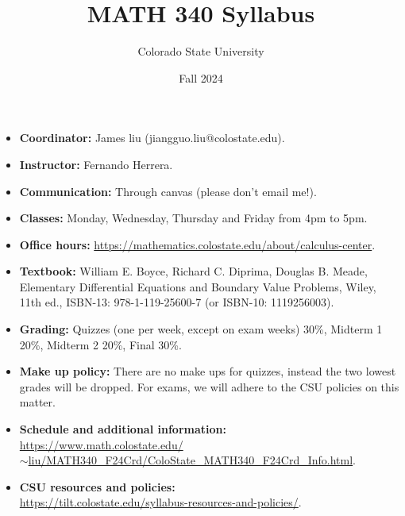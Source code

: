 \documentclass{article}
\begin{document}
\title{MATH 340 Syllabus}
\author{Colorado State University}
\date{Fall 2024}
\maketitle
\begin{itemize}
	\item \textbf{Coordinator:} James liu (jiangguo.liu@colostate.edu).
	\item \textbf{Instructor:} Fernando Herrera.
	\item \textbf{Communication:} Through canvas (please don't email me!).
	\item \textbf{Classes:} Monday, Wednesday, Thursday and Friday from 4pm to 5pm.
	\item \textbf{Office hours:} \href{https://mathematics.colostate.edu/about/calculus-center/#1622492340773-4e5ff3c4-bcd0}{https://mathematics.colostate.edu/about/calculus-center}.
	\item \textbf{Textbook:}  William E. Boyce, Richard C. Diprima, Douglas B. Meade,
		Elementary Differential Equations and Boundary Value Problems,
		Wiley, 11th ed., ISBN-13: 978-1-119-25600-7 (or ISBN-10: 1119256003).
	\item \textbf{Grading:} Quizzes (one per week, except on exam weeks) 30\%, Midterm 1 20\%, Midterm 2 20\%, Final 30\%.
	\item \textbf{Make up policy:}
		There are no make ups for quizzes, instead the two lowest grades will be dropped. For exams, we will adhere to the CSU policies on this matter.
	\item \textbf{Schedule and additional information:}\\
		\href{https://www.math.colostate.edu/~liu/MATH340_F24Crd/ColoState_MATH340_F24Crd_Info.html}{https://www.math.colostate.edu/\\
		$\sim$liu/MATH340\_F24Crd/ColoState\_MATH340\_F24Crd\_Info.html}.
	\item \textbf{CSU resources and policies:}\\
		\url{https://tilt.colostate.edu/syllabus-resources-and-policies/}.
\end{itemize}
\end{document}

